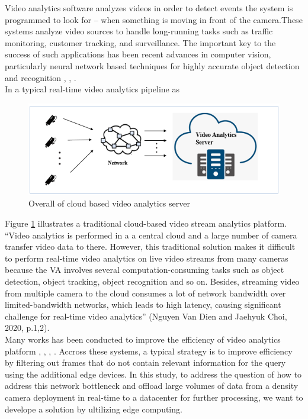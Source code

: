 Video analytics software analyzes videos in order to detect events the system is programmed to look for – when something is moving in front of the camera.These systems analyze video sources to handle long-running tasks such as traffic monitoring, customer tracking, and surveillance. The important key to the success of such applications has been recent advances in computer vision, particularly neural network based techniques for highly accurate object detection and recognition \cite{cai2015learning}, \cite{krizhevsky2017imagenet}, \cite{li2015convolutional}.\\
In a typical real-time video analytics pipeline as 
\begin{figure}
\centering
 \includegraphics[width=1.0\linewidth]{Figures/cloud.png}
 \caption{Overall of cloud based video analytics server}
 \label{fig:overall}
\end{figure}
Figure \ref{fig:overall} illustrates a traditional cloud-based video stream analytics platform. “Video analytics is performed in a a central cloud and a large number of camera transfer video data to there. However, this traditional solution makes it difficult to perform real-time video analytics on live video streams from many cameras because the VA involves several computation-consuming tasks such as object detection, object tracking, object recognition and so on. Besides, streaming video from multiple camera to the cloud consumes a lot of network bandwidth over limited-bandwidth networks, which leads to high latency, causing significant challenge for real-time video analytics” (Nguyen Van Dien and Jaehyuk Choi, 2020, p.1,2).\\
Many works has been conducted to improve the efficiency of video analytics platform \cite{canel2019scaling}, \cite{chen2015glimpse}, \cite{hsieh2018focus}, \cite{jiang2018chameleon}. Accross these systems, a typical strategy is to improve efficiency by filtering out frames that do not contain relevant information for the query using the additional edge devices. In this study, to address the question of how to address this network bottleneck and offload large volumes of data from a density camera deployment in real-time to a datacenter for further processing, we want to develope a solution by ultilizing edge computing.
